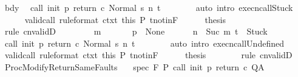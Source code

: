 \begin{isabellebody}
\ bdy\ \isamarkupfalse%
\ {\isachardoublequoteopen}{\isasymGamma}{\isasymturnstile}{\isasymlangle}call\ init\ p\ return{\isacharprime}\ c\ {\isacharcomma}Normal\ s{\isasymrangle}\ {\isacharequal}n{\isasymRightarrow}\ t{\isachardoublequoteclose}\isanewline
\ \ \ \ \ \ \isamarkupfalse%
\ {\isacharparenleft}auto\ intro{\isacharcolon}\ execn{\isacharunderscore}callStuck{\isacharparenright}\isanewline
\ \ \ \ \isamarkupfalse%
\ valid{\isacharunderscore}call\ {\isacharbrackleft}rule{\isacharunderscore}format{\isacharbrackright}\ ctxt\ this\ P\ t{\isacharunderscore}notin{\isacharunderscore}F\isanewline
\ \ \ \ \isamarkupfalse%
\ {\isacharquery}thesis\isanewline
\ \ \ \ \ \ \isamarkupfalse%
\ {\isacharparenleft}rule\ cnvalidD{\isacharparenright}\isanewline
\ \ \isamarkupfalse%
\isanewline
\ \ \ \ \isamarkupfalse%
\ m\isanewline
\ \ \ \ \isamarkupfalse%
\ {\isachardoublequoteopen}{\isasymGamma}\ p\ {\isacharequal}\ None{\isachardoublequoteclose}\isanewline
\ \ \ \ \ \ {\isachardoublequoteopen}n\ {\isacharequal}\ Suc\ m{\isachardoublequoteclose}\ {\isachardoublequoteopen}t\ {\isacharequal}\ Stuck{\isachardoublequoteclose}\isanewline
\ \ \ \ \isamarkupfalse%
\ \isamarkupfalse%
\ {\isachardoublequoteopen}{\isasymGamma}{\isasymturnstile}{\isasymlangle}call\ init\ p\ return{\isacharprime}\ c\ {\isacharcomma}Normal\ s{\isasymrangle}\ {\isacharequal}n{\isasymRightarrow}\ t{\isachardoublequoteclose}\isanewline
\ \ \ \ \ \ \isamarkupfalse%
\ {\isacharparenleft}auto\ intro{\isacharcolon}\ execn{\isacharunderscore}callUndefined{\isacharparenright}\isanewline
\ \ \ \ \isamarkupfalse%
\ valid{\isacharunderscore}call\ {\isacharbrackleft}rule{\isacharunderscore}format{\isacharbrackright}\ ctxt\ this\ P\ t{\isacharunderscore}notin{\isacharunderscore}F\isanewline
\ \ \ \ \isamarkupfalse%
\ {\isacharquery}thesis\isanewline
\ \ \ \ \ \ \isamarkupfalse%
\ {\isacharparenleft}rule\ cnvalidD{\isacharparenright}\isanewline
\ \ \isamarkupfalse%
\isanewline
{}\isamarkupfalse%
%
\endisatagproof
{\isafoldproof}%
%
\isadelimproof
\isanewline
%
\endisadelimproof
\isanewline
\isanewline
{}\isamarkupfalse%
\ ProcModifyReturnSameFaults{\isacharcolon}\isanewline
\ \ \ spec{\isacharcolon}\ {\isachardoublequoteopen}{\isasymGamma}{\isacharcomma}{\isasymTheta}{\isasymturnstile}\isactrlbsub {\isacharslash}F\isactrlesub \ P\ {\isacharparenleft}call\ init\ p\ return{\isacharprime}\ c{\isacharparenright}\ Q{\isacharcomma}A{\isachardoublequoteclose}\isanewline

\end{isabellebody}
